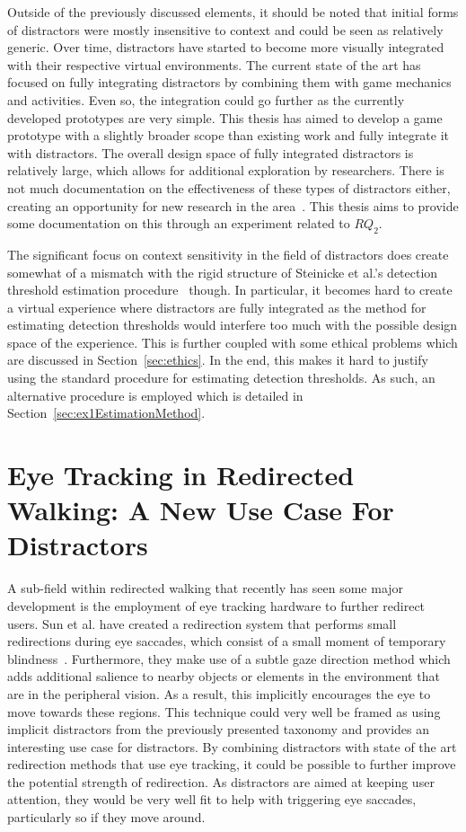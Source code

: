 Outside of the previously discussed elements, it should be noted that initial forms of distractors were mostly insensitive to context and could be seen as relatively generic. Over time, distractors have started to become more visually integrated with their respective virtual environments. The current state of the art has focused on fully integrating distractors by combining them with game mechanics and activities. Even so, the integration could go further as the currently developed prototypes are very simple. This thesis has aimed to develop a game prototype with a slightly broader scope than existing work and fully integrate it with distractors. The overall design space of fully integrated distractors is relatively large, which allows for additional exploration by researchers. There is not much documentation on the effectiveness of these types of distractors either, creating an opportunity for new research in the area~\cite{nilsson201815}. This thesis aims to provide some documentation on this through an experiment related to $RQ_2$.

The significant focus on context sensitivity in the field of distractors does create somewhat of a mismatch with the rigid structure of Steinicke et al.'s detection threshold estimation procedure~\cite{5072212} though. In particular, it becomes hard to create a virtual experience where distractors are fully integrated as the method for estimating detection thresholds would interfere too much with the possible design space of the experience. This is further coupled with some ethical problems which are discussed in Section~\ref{sec:ethics}. In the end, this makes it hard to justify using the standard procedure for estimating detection thresholds. As such, an alternative procedure is employed which is detailed in Section~\ref{sec:ex1EstimationMethod}. 

\section{Eye Tracking in Redirected Walking: A New Use Case For Distractors}\label{sec:relatedEyeTracking}
A sub-field within redirected walking that recently has seen some major development is the employment of eye tracking hardware to further redirect users. Sun et al. have created a redirection system that performs small redirections during eye saccades, which consist of a small moment of temporary blindness~\cite{sun2018towards}. Furthermore, they make use of a subtle gaze direction method which adds additional salience to nearby objects or elements in the environment that are in the peripheral vision. As a result, this implicitly encourages the eye to move towards these regions. This technique could very well be framed as using implicit distractors from the previously presented taxonomy and provides an interesting use case for distractors. By combining distractors with state of the art redirection methods that use eye tracking, it could be possible to further improve the potential strength of redirection. As distractors are aimed at keeping user attention, they would be very well fit to help with triggering eye saccades, particularly so if they move around. 

